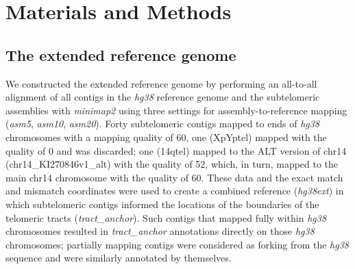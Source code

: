 \documentclass{article}
\begin{document}
\section*{Materials and Methods}  \label{sec:methods}

\subsection*{The extended reference genome}
    We constructed the extended reference genome by performing an all-to-all alignment
        of all contigs in the \textit{hg38} reference genome \parencite{grch38,hg38}
        and the subtelomeric assemblies \parencite{riethman2014}
        with \textit{minimap2} \parencite{minimap} using three settings
            for assembly-to-reference mapping (\textit{asm5}, \textit{asm10}, \textit{asm20}).
    Forty subtelomeric contigs mapped to ends of \textit{hg38} chromosomes with a mapping quality of 60,
        one (XpYptel) mapped with the quality of 0 and was discarded;
        one (14qtel) mapped to the ALT version of chr14 (chr14\_KI270846v1\_alt) with the quality of 52,
            which, in turn, mapped to the main chr14 chromosome with the quality of 60.
    These data and the exact match and mismatch coordinates were used to create a combined reference (\textit{hg38ext})
        in which subtelomeric contigs informed the locations of the boundaries of the telomeric tracts (\textit{tract\_anchor}).
    Such contigs that mapped fully within \textit{hg38} chromosomes resulted in \textit{tract\_anchor} annotations
            directly on those \textit{hg38} chromosomes;
        partially mapping contigs were considered as forking from the \textit{hg38} sequence and were similarly annotated by themselves.
\end{document}
